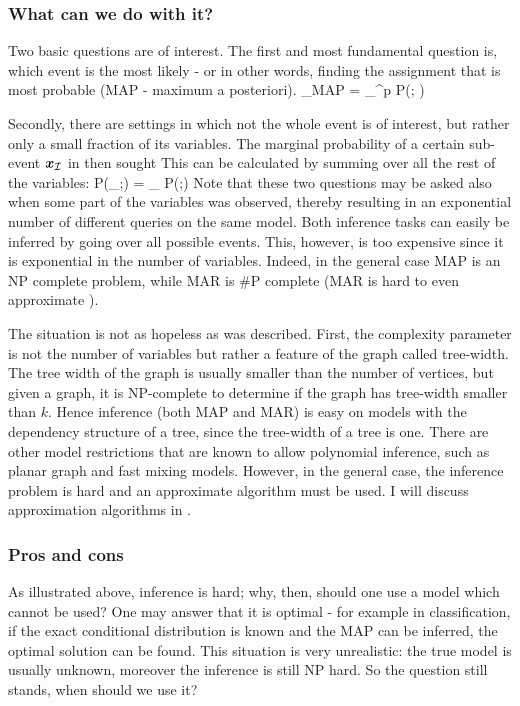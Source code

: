 \subsubsection{What can we do with it?}
Two basic questions are of interest.
The first and most fundamental question is, which event is the most likely - or in other words, finding the assignment that is most probable (MAP - maximum a posteriori).
\be
\label{eq:MAP}
\xx_{MAP} = \arg \max_{\xx \in \cX^p} P(\xx; \thetav) 
\ee

Secondly, there are settings in which not the whole event is of interest, but rather only a small fraction of its variables.
The marginal probability of a certain sub-event $\boldsymbol{x}_{{\cal I}}$ in then sought
This can be calculated by summing over all the rest of the variables:
\be
\label{eq:MAR}
P(\xx_{\cI};\thetav) = \sum_{} P(\zz;\thetav)
\ee
Note that these two questions may be asked also when some part of the variables was observed, thereby resulting in an exponential number of different queries on the same model. 
Both inference tasks can easily be inferred by going over all possible events.
This, however, is too expensive since it is exponential in the number of variables.
Indeed, in the general case MAP\cite{shimony1994finding} is an NP complete problem, while MAR\cite{cooper1990computational} is \#P complete (MAR is hard to even approximate \cite{roth1996hardness}).

The situation is not as hopeless as was described.
First, the complexity parameter is not the number of variables but rather a feature of the graph called tree-width\cite{robertson1983graph,robertson1994quickly}.
The tree width of the graph is usually smaller than the number of vertices, but given a graph, it is NP-complete to determine if the graph has tree-width smaller than $k$\cite{Arnborg:1987}.
Hence inference (both MAP and MAR) is easy on models with the dependency structure of a tree, since the tree-width of a tree is one.
There are other model restrictions that are known to allow polynomial inference, such as planar graph \cite{jaakkola2007approximate} and fast mixing models\cite{jerrum1993polynomial}.
However, in the general case, the inference problem is hard and an approximate algorithm must be used.
I will discuss approximation algorithms in  . 
\subsubsection{Pros and cons}
As illustrated above, inference is hard; why, then, should one use a model which cannot be used?
One may answer that it is optimal - for example in classification, if the exact conditional distribution is known and the MAP can be inferred, the optimal solution can be found. 
This situation is very unrealistic: the true model is usually unknown, moreover the inference is still NP hard.
So the question still stands, when should we use it?

